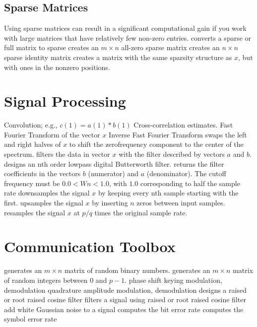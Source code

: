 \subsection{Sparse Matrices}{Using sparse matrices can result in a significant
    computational gain if you work with large matrices that have relatively few
    non-zero entries.}
	{converts a sparse or full matrix to sparse}
	{creates an $m \times n$ all-zero sparse matrix}
	{creates an $n \times n$ sparse identity matrix}
	{creates a matrix with the same sparsity structure as $x$, but with ones in the nonzero positions.}

\section{Signal Processing}{}
	{Convolution; e.g., $c(1)=a(1)*b(1)$}
	{Cross-correlation estimates.}
	{Fast Fourier Transform of the vector $x$}
	{Inverse Fast Fourier Transform}
	{swaps the left and right halves of $x$ to shift the zerofrequency component to the center of the spectrum.}
	{filters the data in vector $x$ with the filter described by vectors $a$ and $b$.}
	{designs an nth order lowpass digital Butterworth filter.}
	{returns the filter coefficients in the vectors $b$
    (numerator) and $a$ (denominator). The cutoff frequency must be $0.0 < Wn < 1.0$,
    with $1.0$ corresponding to half the sample rate}
	{downsamples the signal $x$ by keeping every nth sample starting with the first.}
	{upsamples the signal $x$ by inserting $n$ zeros between input samples.}
	{resamples the signal $x$ at $p/q$ times the original sample rate.}

\section{Communication Toolbox}{}
	{generates an $m \times n$ matrix of random binary numbers.}
	{generates an $m \times n$ matrix of random integers between $0$ and $p-1$.}
	{phase shift keying modulation, demodulation}
	{quadrature amplitude modulation, demodulation}
	{designs a raised or root raised cosine filter}
	{filters a signal using raised or root raised cosine filter}
	{add white Gaussian noise to a signal}
	{computes the bit error rate}
	{computes the symbol error rate}


